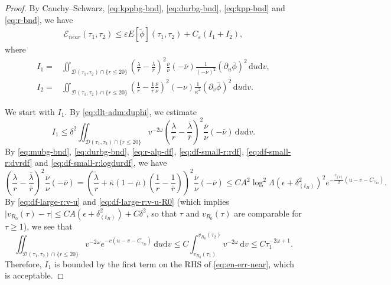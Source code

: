 \documentclass[10pt, reqno]{amsart}
\theoremstyle{definition}
\theoremstyle{remark}
\theoremstyle{conjecture}
\numberwithin{equation}{section}
\newcommand{\abs}[1]{\vert#1\vert}
\newcommand{\set}[1]{\{#1\}}
\newcommand{\ud}{\mathrm{d}}
\newcommand{\rd}{\partial}
\newcommand{\0}{\emptyset}
\newcommand{\gmm}{\gamma}
\newcommand{\dlt}{\delta}
\newcommand{\eps}{\epsilon}
\newcommand{\veps}{\varepsilon}
\newcommand{\kpp}{\kappa}
\newcommand{\lmb}{\lambda}
\newcommand{\Lmb}{\Lambda}
\newcommand{\omg}{\omega}
\newcommand{\calD}{\mathcal D}
\newcommand{\calE}{\mathcal E}
\newcommand{\dur}{\nu}
\newcommand{\dvr}{\lmb}
\newcommand{\f}{\frac}
\newcommand{\phibg}{\overline{\phi}}				%
\newcommand{\dvrbg}{\overline{\dvr}}				%
\newcommand{\durbg}{\overline{\dur}}				%
\newcommand{\rbg}{\overline{r}}					%
\newcommand{\mubg}{\overline{\mu}}				%
\newcommand{\kppbg}{\overline{\kpp}}					%
\newcommand{\phidf}{\widetilde{\phi}}				%
\newcommand{\dvrdf}{\widetilde{\dvr}}				%
\begin{document}
\begin{proof}
By Cauchy--Schwarz, \eqref{eq:kppbg-bnd}, \eqref{eq:durbg-bnd}, \eqref{eq:kpp-bnd} and \eqref{eq:r-bnd}, we have
\begin{align*}
	\calE_{near}(\tau_{1}, \tau_{2})
	\leq \veps E[\phidf](\tau_{1}, \tau_{2}) 
		+ C_{\veps} (I_{1} + I_{2}), 
\end{align*}
where
\begin{align*}
	I_{1} = & \iint_{\calD(\tau_{1}, \tau_{2}) \cap \set{r \leq 20}} \left(\frac{\dvr}{r} - \frac{\dvrbg}{\rbg} \right)^{2} \frac{\durbg}{\dur}(-\durbg) \frac{1}{(-\durbg)^{2}} (\rd_{u} \phibg)^{2} \, \ud u \ud v , \\
	I_{2} = & \iint_{\calD(\tau_{1}, \tau_{2}) \cap \set{r \leq 20}} \left(\frac{1}{r} - \frac{1}{\rbg} \frac{\durbg}{\dur} \right)^{2} (-\dur) \frac{1}{\kppbg^{2}}(\rd_{v} \phibg)^{2} \, \ud u \ud v .
\end{align*}

We start with $I_{1}$. By \eqref{eq:dlt-adm:duphi}, we estimate
\begin{equation*}
	I_{1} \leq \dlt^{2} \iint_{\calD(\tau_{1}, \tau_{2}) \cap \set{r \leq 20}} v^{-2 \omg} \left(\frac{\dvr}{r} - \frac{\dvrbg}{\rbg} \right)^{2} \frac{\durbg}{\dur} (-\durbg)  \, \ud u \ud v.
\end{equation*}
By \eqref{eq:mubg-bnd}, \eqref{eq:durbg-bnd},  \eqref{eq:r-alp-df}, \eqref{eq:df-small-r:rdf}, \eqref{eq:df-small-r:dvrdf} and \eqref{eq:df-small-r:logdurdf}, we have
\begin{equation*}
	\left(\frac{\dvr}{r} - \frac{\dvrbg}{\rbg} \right)^{2} \frac{\durbg}{\dur} (-\durbg) 
	= \left(\frac{\dvrdf}{r} + \kppbg (1-\mubg) \left(\frac{1}{r} - \frac{1}{\rbg} \right) \right)^{2} \frac{\durbg}{\dur} (-\durbg) 
	\leq C A^{2} \log^{2} \Lmb \left( \eps + \dlt_{(t_{B})}^{2} \right)^{2} e^{- \f{c_{(\durbg)}}{2} (u - v - C_{\gmm_{20}})}.
\end{equation*}
By \eqref{eq:df-large-r:v-u} and \eqref{eq:df-large-r:v-u-R0} (which implies $\abs{v_{R_{0}}(\tau) - \tau} \leq C A (\eps + \dlt_{(t_{B})}^{2}) + C \dlt^{2}$, so that $\tau$ and $v_{R_{0}}(\tau)$ are comparable for $\tau \geq 1$), we see that
\begin{equation} \label{eq:en-err-near:pf-1}
	\iint_{\calD(\tau_{1}, \tau_{2}) \cap \set{r \leq 20}} v^{-2 \omg} e^{-c (u - v - C_{\gmm_{20}})} \, \ud u \ud v
	\leq C \int_{v_{R_{0}}(\tau_{1})}^{v_{R_{0}}(\tau_{2})} v^{-2 \omg} \, \ud v
	\leq C \tau_{1}^{-2\omg + 1}.
\end{equation}
Therefore, $I_{1}$ is bounded by the first term on the RHS of \eqref{eq:en-err-near}, which is acceptable.



\end{proof}
\end{document}
